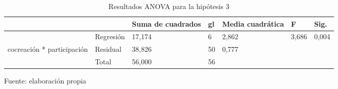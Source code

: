 \begin{table}[h]
    \caption {Resultados ANOVA para la hipótesis 3}
	\label{tab:anovaH3}
	\setlength\extrarowheight{5pt}
	
	\begin{tabular}{p{2.3cm} p{3.0cm} p{1.8cm} p{0.9cm} p{1.8cm} p{0.9cm} p{1.9cm}}
	\toprule
			&						& Suma de cuadrados	& gl	& Media cuadrática	& F	& Sig. \\
	\midrule
			& Regresión						& 17,174	& 6		& 2,862	& 3,686	& 0,004 \\
	cocreación * participación	& Residual	& 38,826	& 50	& 0,777	&	& \\
			& Total							& 56,000	& 56 \\
	\bottomrule
	\end{tabular}
	
	\center
	\footnotesize
	Fuente: elaboración propia
\end{table}
